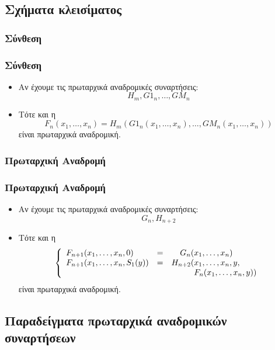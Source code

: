 \documentclass{beamer}
\begin{document}
\subsection{Σχήματα κλεισίματος}

\subsubsection{Σύνθεση}

\begin{frame}
  \frametitle{Σύνθεση}
  \begin{itemize}
  \item Αν έχουμε τις πρωταρχικά αναδρομικές συναρτήσεις: $$H_m, G1_n,
    \ldots, GM_n$$
  \item Τότε και η
    $$
    F_n(x_1,\ldots,x_n) =
    H_m(G1_n(x_1,\ldots,x_n),\ldots,GM_n(x_1,\ldots,x_n))
    $$
    είναι πρωταρχικά αναδρομική.
  \end{itemize}
\end{frame}

\subsubsection{Πρωταρχική Αναδρομή}

\begin{frame}
  \frametitle{Πρωταρχική Αναδρομή}
  \begin{itemize}
  \item Αν έχουμε τις πρωταρχικά αναδρομικές συναρτήσεις:
    $$
    G_n, H_{n+2}
    $$
  \item Τότε και η
    $$
    \left\{
    \begin{array}{llr@{}l}
      F_{n+1}(x_1,\ldots,x_n, 0)     &=&    G_n(&x_1,\ldots,x_n) \\
      F_{n+1}(x_1,\ldots,x_n, S_1(y))&=&H_{n+2}(&x_1,\ldots,x_n, y ,\\
      & &        &F_n(x_1,\ldots,x_n, y))
    \end{array}
    \right.
    $$
    είναι πρωταρχικά αναδρομική.
  \end{itemize}
\end{frame}

\subsection{Παραδείγματα πρωταρχικά αναδρομικών συναρτήσεων}
\end{document}
